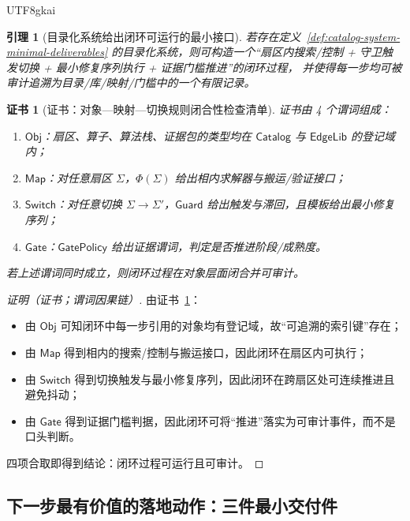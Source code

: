 \documentclass[12pt]{article}
\newtheorem{lemma}{引理}[section]
\newtheorem{Certificate}{证书}[section]
\begin{document}
\begin{CJK*}{UTF8}{gkai}
\begin{lemma}[目录化系统给出闭环可运行的最小接口]
\label{lem:catalog-system-closed-loop-interface}
若存在定义~\ref{def:catalog-system-minimal-deliverables} 的目录化系统，则可构造一个“扇区内搜索/控制 + 守卫触发切换 + 最小修复序列执行 + 证据门槛推进”的闭环过程，
并使得每一步均可被审计追溯为目录/库/映射/门槛中的一个有限记录。
\end{lemma}

\begin{Certificate}[证书：对象—映射—切换规则闭合性检查清单]
\label{cert:catalog-system-closed-loop-interface}
证书由 4 个谓词组成：
\begin{enumerate}
  \item $\mathsf{Obj}$：扇区、算子、算法栈、证据包的类型均在 $\mathsf{Catalog}$ 与 $\mathsf{EdgeLib}$ 的登记域内；
  \item $\mathsf{Map}$：对任意扇区 $\Sigma$，$\Phi(\Sigma)$ 给出相内求解器与搬运/验证接口；
  \item $\mathsf{Switch}$：对任意切换 $\Sigma\to\Sigma'$，$\mathsf{Guard}$ 给出触发与滞回，且模板给出最小修复序列；
  \item $\mathsf{Gate}$：$\mathsf{GatePolicy}$ 给出证据谓词，判定是否推进阶段/成熟度。
\end{enumerate}
若上述谓词同时成立，则闭环过程在对象层面闭合并可审计。
\end{Certificate}

\begin{proof}[证明（证书；谓词因果链）]
由证书~\ref{cert:catalog-system-closed-loop-interface}：
\begin{itemize}
  \item 由 $\mathsf{Obj}$ 可知闭环中每一步引用的对象均有登记域，故“可追溯的索引键”存在；
  \item 由 $\mathsf{Map}$ 得到相内的搜索/控制与搬运接口，因此闭环在扇区内可执行；
  \item 由 $\mathsf{Switch}$ 得到切换触发与最小修复序列，因此闭环在跨扇区处可连续推进且避免抖动；
  \item 由 $\mathsf{Gate}$ 得到证据门槛判据，因此闭环可将“推进”落实为可审计事件，而不是口头判断。
\end{itemize}
四项合取即得到结论：闭环过程可运行且可审计。
\end{proof}

\subsection{下一步最有价值的落地动作：三件最小交付件}
\label{sec:dialogue-next-actions}


\end{CJK*}
\end{document}
